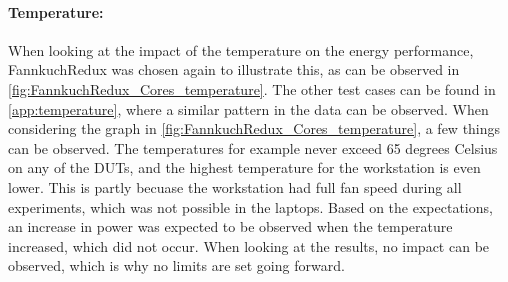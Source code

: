 

\paragraph{Temperature:} When looking at the impact of the temperature on the energy performance, FannkuchRedux was chosen again to illustrate this, as can be observed in \cref{fig:FannkuchRedux_Cores_temperature}. The other test cases can be found in \cref{app:temperature}, where a similar pattern in the data can be observed. When considering the graph in \cref{fig:FannkuchRedux_Cores_temperature}, a few things can be observed. The temperatures for example never exceed 65 degrees Celsius on any of the DUTs, and the highest temperature for the workstation is even lower. This is partly becuase the workstation had full fan speed during all experiments, which was not possible in the laptops. Based on the expectations, an increase in power was expected to be observed when the temperature increased, which did not occur. When looking at the results, no impact can be observed, which is why no limits are set going forward.





